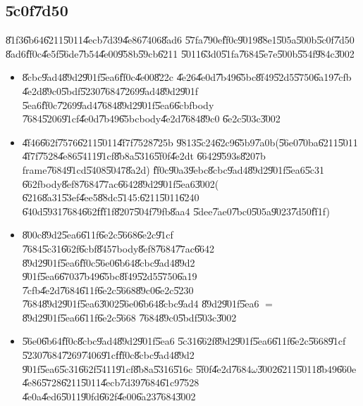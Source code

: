\documentclass[12pt,a4paper]{article}
\begin{document}
\bigskip

\subsection{\U{5c0f}\U{7d50}}

\U{81f3}\U{6b64}\U{6211}\U{5011}\U{4ecb}\U{7d39}\U{4e86}\U{7406}\U{8ad6}%
\U{57fa}\U{790e}\U{ff0c}\U{9019}\U{88e1}\U{505a}\U{500b}\U{5c0f}\U{7d50}%
\U{8ad6}\U{ff0c}\U{4e5f}\U{56de}\U{7b54}\U{4e00}\U{958b}\U{59cb}\U{6211}%
\U{5011}\U{63d0}\U{51fa}\U{7684}\U{5e7e}\U{500b}\U{554f}\U{984c}\U{3002}

\begin{itemize}
\item \U{8cbc}\U{9ad4}\U{89d2}\U{901f}\U{5ea6}\U{ff0c}\U{4e00}\U{822c}%
\U{4e26}\U{4e0d}\U{7b49}\U{65bc}\U{8f49}\U{52d5}\U{5750}\U{6a19}\U{7cfb}%
\U{4e2d}\U{89c0}\U{5bdf}\U{5230}\U{7684}\U{7269}\U{9ad4}\U{89d2}\U{901f}%
\U{5ea6}\U{ff0c}\U{7269}\U{9ad4}\U{7684}\U{89d2}\U{901f}\U{5ea6}\U{6cbf}body%
\U{7684}\U{5206}\U{91cf}\U{4e0d}\U{7b49}\U{65bc}body\U{4e2d}\U{7684}\U{89c0}%
\U{6e2c}\U{503c}\U{3002}

\item \U{4f46}\U{662f}\U{7576}\U{6211}\U{5011}\U{4f7f}\U{7528}\U{725b}%
\U{9813}\U{5c24}\U{62c9}\U{65b9}\U{7a0b}(\U{56e0}\U{70ba}\U{6211}\U{5011}%
\U{4f7f}\U{7528}\U{4e86}\U{5411}\U{91cf}\U{8b8a}\U{5316}\U{5f0f}\U{4e2d}t%
\U{6642}\U{9593}s\U{8207}b frame\U{7684}\U{91cd}\U{5408}\U{5047}\U{8a2d})%
\U{ff0c}\U{90a3}\U{9ebc}\U{8cbc}\U{9ad4}\U{89d2}\U{901f}\U{5ea6}\U{5c31}%
\U{662f}body\U{8ef8}\U{7684}\U{77ac}\U{6642}\U{89d2}\U{901f}\U{5ea6}\U{3002}(%
\U{6216}\U{8a31}\U{53ef}\U{4ee5}\U{88dc}\U{5145}:\U{6211}\U{5011}\U{6240}%
\U{640d}\U{5931}\U{7684}\U{662f}\U{ff1f}\U{8207}\U{504f}\U{79fb}\U{8aa4}%
\U{5dee}\U{7ae0}\U{7bc0}\U{505a}\U{9023}\U{7d50}\U{ff1f})

\item \U{800c}\U{89d2}\U{5ea6}\U{611f}\U{6e2c}\U{5668}\U{6e2c}\U{91cf}%
\U{7684}\U{5c31}\U{662f}\U{6cbf}\U{8457}body\U{8ef8}\U{7684}\U{77ac}\U{6642}%
\U{89d2}\U{901f}\U{5ea6}\U{ff0c}\U{56e0}\U{6b64}\U{8cbc}\U{9ad4}\U{89d2}%
\U{901f}\U{5ea6}\U{6703}\U{7b49}\U{65bc}\U{8f49}\U{52d5}\U{5750}\U{6a19}%
\U{7cfb}\U{4e2d}\U{7684}\U{611f}\U{6e2c}\U{5668}\U{89c0}\U{6e2c}\U{5230}%
\U{7684}\U{89d2}\U{901f}\U{5ea6}\U{3002}\U{56e0}\U{6b64}\U{8cbc}\U{9ad4}%
\U{89d2}\U{901f}\U{5ea6} $=$ \U{89d2}\U{901f}\U{5ea6}\U{611f}\U{6e2c}\U{5668}%
\U{7684}\U{89c0}\U{5bdf}\U{503c}\U{3002}

\item \U{56e0}\U{6b64}\U{ff0c}\U{8cbc}\U{9ad4}\U{89d2}\U{901f}\U{5ea6}%
\U{5c31}\U{662f}\U{89d2}\U{901f}\U{5ea6}\U{611f}\U{6e2c}\U{5668}\U{91cf}%
\U{5230}\U{7684}\U{7269}\U{7406}\U{91cf}\U{ff0c}\U{8cbc}\U{9ad4}\U{89d2}%
\U{901f}\U{5ea6}\U{5c31}\U{662f}\U{5411}\U{91cf}\U{8b8a}\U{5316}\U{516c}%
\U{5f0f}\U{4e2d}\U{7684}$\omega $\U{3002}\U{6211}\U{5011}\U{8b49}\U{660e}%
\U{4e86}\U{5728}\U{6211}\U{5011}\U{4ecb}\U{7d39}\U{7684}\U{61c9}\U{7528}%
\U{4e0a}\U{4ed6}\U{5011}\U{90fd}\U{662f}\U{4e00}\U{6a23}\U{7684}\U{3002}


\end{itemize}
\end{document}
